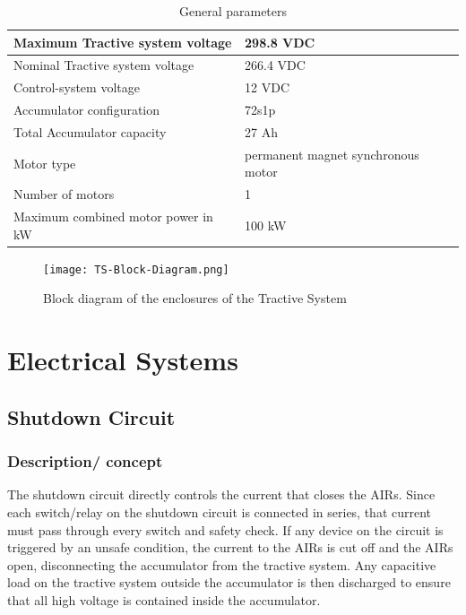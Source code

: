 \documentclass{article}
\begin{document}
	\begin{table}[H]
        \centering
        \begin{tabular}{|l|l|}
        \hline
            Maximum Tractive system voltage & 298.8 VDC \\ \hline
            Nominal Tractive system voltage & 266.4 VDC \\ \hline
            Control-system voltage & 12 VDC \\ \hline
            Accumulator configuration & 72s1p \\ \hline
            Total Accumulator capacity & 27 Ah \\ \hline
            Motor type & permanent magnet synchronous motor \\ \hline
            Number of motors & 1 \\ \hline
            Maximum combined motor power in kW & 100 kW \\ \hline
        \end{tabular}
        \caption{General parameters}
        \label{systemtable}
  \end{table}

  \begin{figure}[H]
  \centering
  \texttt{[image: TS-Block-Diagram.png]}
  \caption{Block diagram of the enclosures of the Tractive System}
  \label{fig:TS_block_diagram}
  \end{figure}


\section{Electrical Systems}\label{electrical_systems}

\subsection{Shutdown Circuit}\label{shutdown_circuit}

\subsubsection{Description/ concept}

The shutdown circuit directly controls the current that closes the AIRs. Since each switch/relay on the shutdown circuit is connected in series, that current must pass through every switch and safety check. If any device on the circuit is triggered by an unsafe condition, the current to the AIRs is cut off and the AIRs open, disconnecting the accumulator from the tractive system. Any capacitive load on the tractive system outside the accumulator is then discharged to ensure that all high voltage is contained inside the accumulator. 
\end{document}
